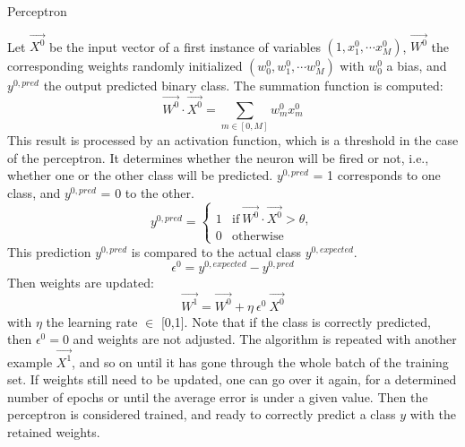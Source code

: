 \clearpage
\begin{algorithm}[!ht]
  \caption{Perceptron}\label{alg:perceptron}
  \begin{algorithmic}[1]
    \STATEx Let \( \overrightarrow{X^0} \) be the input vector of a first instance of variables \( (1, x_1^0, \cdots x_M^0) \), \( \overrightarrow{W^0} \) the corresponding weights randomly initialized \( (w_0^0, w_1^0, \cdots w_M^0) \) with \(w_0^0\) a bias, and \(y^{0, pred}\) the output predicted binary class. 
    \STATE The summation function is computed: 
    \begin{equation}
        \overrightarrow{W^0} \cdot \overrightarrow{X^0} = \sum_{m \in [0,M]} w_m^0 x_m^0
    \end{equation}
    \STATE This result is processed by an activation function, which is a threshold in the case of the perceptron. It determines whether the neuron will be fired or not, i.e., whether one or the other class will be predicted. $y^{0,pred}$ = 1 corresponds to one class, and $y^{0,pred}$ = 0 to the other. 
    \begin{equation}
        y^{0,pred} = 
        \begin{cases}
            1 & \text{if} \ \overrightarrow{W^0} \cdot \overrightarrow{X^0} > \theta,\\
            0 & \text{otherwise}
        \end{cases}
    \end{equation}
    \STATE This prediction $y^{0,pred}$ is compared to the actual class $y^{0,expected}$. 
    \begin{equation}
        \epsilon^0 = y^{0,expected} - y^{0,pred}
    \end{equation}
    \STATE Then weights are updated: 
    \begin{equation}
        \overrightarrow{W^1} = \overrightarrow{W^0} + \eta \ \epsilon^0 \ \overrightarrow{X^0}
    \end{equation}
    \STATEx with $\eta$ the learning rate $\in$ [0,1]. Note that if the class is correctly predicted, then $\epsilon^0=0$ and weights are not adjusted.   
  \STATE The algorithm is repeated with another example $\overrightarrow{X^1}$, and so on until it has gone through the whole batch of the training set. If weights still need to be updated, one can go over it again, for a determined number of epochs or until the average error is under a given value. Then the perceptron is considered trained, and ready to correctly predict a class $y$ with the retained weights.
  \end{algorithmic}
\end{algorithm}

